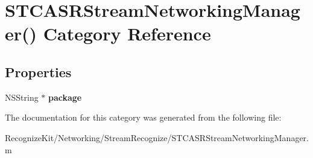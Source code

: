 \hypertarget{category_s_t_c_a_s_r_stream_networking_manager_07_08}{}\section{S\+T\+C\+A\+S\+R\+Stream\+Networking\+Manager() Category Reference}
\label{category_s_t_c_a_s_r_stream_networking_manager_07_08}
\subsection*{Properties}
\begin{DoxyCompactItemize}
\item 
\hypertarget{category_s_t_c_a_s_r_stream_networking_manager_07_08_ae2416c47229a61959838b7246a414be8}{}\label{category_s_t_c_a_s_r_stream_networking_manager_07_08_ae2416c47229a61959838b7246a414be8} 
N\+S\+String $\ast$ {\bfseries package}
\end{DoxyCompactItemize}


The documentation for this category was generated from the following file\+:\begin{DoxyCompactItemize}
\item 
Recognize\+Kit/\+Networking/\+Stream\+Recognize/S\+T\+C\+A\+S\+R\+Stream\+Networking\+Manager.\+m\end{DoxyCompactItemize}
